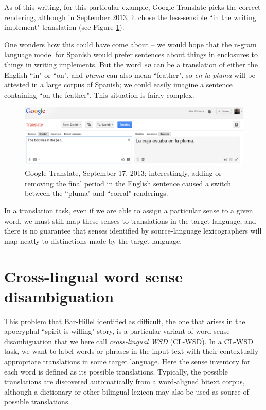 As of this writing, for this particular example, Google Translate picks the
correct rendering, although in September 2013, it chose the less-sensible 
``in the writing implement" translation (see Figure \ref{fig:box-in-pen}).

One wonders how this could have come about -- we would hope that the n-gram
language model for Spanish would prefer sentences about things in enclosures to
things in writing implements.
But the word \emph{en} can be a translation of either the English ``in" or
``on", and \emph{pluma} can also mean ``feather", so \emph{en la pluma} will be
attested in a large corpus of Spanish; we could easily imagine a sentence
containing ``on the feather". This situation is fairly complex.

\begin{figure}
  \includegraphics[width=12cm]{box-in-pen.png}
  \caption{Google Translate, September 17, 2013; interestingly, adding or
  removing the final period in the English sentence caused a switch between the
  ``pluma" and ``corral" renderings.}
  \label{fig:box-in-pen}
\end{figure}

In a translation task, even if we are able to assign a particular sense to a
given word, we must still map these senses to translations in the target
language, and there is no guarantee that senses identified by source-language
lexicographers will map neatly to distinctions made by the target language.




\section{Cross-lingual word sense disambiguation}
\label{sec:clwsd}

This problem that Bar-Hillel identified as difficult, the one that arises
in the apocryphal ``spirit is willing" story, is a particular variant of word
sense disambiguation that we here call \emph{cross-lingual WSD} (CL-WSD).
In a CL-WSD task, we  want to label words or phrases in the input text with
their contextually-appropriate translations in some target language. Here the
sense inventory for each word is defined as its possible translations.
Typically, the possible translations are discovered automatically from a
word-aligned bitext corpus, although a dictionary or other bilingual lexicon
may also be used as source of possible translations.

